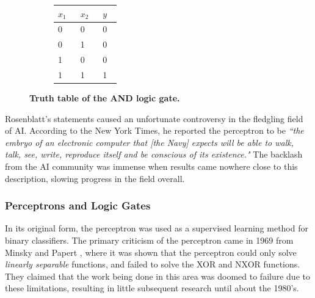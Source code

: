 \begin{figure}[!htp]
    \centering
    \begin{subfigure}[b]{0.70\textwidth}
        \centering
        
        \captionsetup{format=hang} %
        \label{fig:perceptron:and:mapping}
    \end{subfigure}\hfil
    \begin{subfigure}[b]{0.29\textwidth}
        \centering
        \renewcommand{\arraystretch}{1.5}
        \begin{tabular}{C{0.1\linewidth}C{0.1\linewidth}|C{0.1\linewidth}}
            \hline
            $x_1$ & $x_2$ & $y$ \\      & 0     & 0   \\
            0     & 1     & 0   \\
            1     & 0     & 0   \\
            1     & 1     & 1
        \end{tabular}
        \vspace{0.5cm}
        \label{fig:perceptron:and:truth}
    \end{subfigure}\hfil
    \captionsetup{format=hang} %
    \caption{
        \textbf{Truth table of the AND logic gate.}
    }
    \label{fig:perceptron:and}
\end{figure}



Rosenblatt's statements caused an unfortunate controversy in the fledgling field
of \gls{AI}. According to the New York Times, he reported the perceptron to be
\textit{``the embryo of an electronic computer that [the Navy] expects will be
able to walk, talk, see, write, reproduce itself and be conscious of its
existence."} \cite{Olazaran1996} The backlash from the \gls{AI} community was
immense when results came nowhere close to this description, slowing progress
in the field overall.

\subsubsection{Perceptrons and Logic Gates}

In its original form, the perceptron was used as a supervised learning method
for binary classifiers. The primary criticism of the perceptron came in 1969
from Minsky and Papert \cite{minsky69perceptrons}, where it was shown that the
perceptron could only solve \textit{linearly separable} functions, and failed to
solve the XOR and NXOR functions. They claimed that the work being done in this
area was doomed to failure due to these limitations, resulting in little
subsequent research until about the 1980's.

